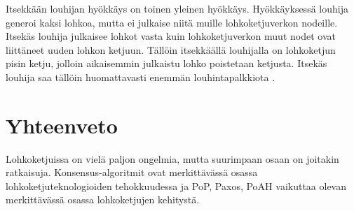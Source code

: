 \documentclass[utf8,bachelor]{gradu3}
\begin{document}
Itsekkään louhijan hyökkäys on toinen yleinen hyökkäys. Hyökkäyksessä louhija generoi kaksi lohkoa, mutta ei julkaise niitä muille lohkoketjuverkon nodeille. Itsekäs louhija julkaisee lohkot vasta kuin lohkoketjuverkon muut nodet ovat liittäneet uuden lohkon ketjuun. Tällöin itsekkäällä louhijalla on lohkoketjun pisin ketju, jolloin aikaisemmin julkaistu lohko poistetaan ketjusta. Itsekäs louhija saa tällöin huomattavasti enemmän louhintapalkkiota \parencite{zheng2017overview}. 




 \chapter{Yhteenveto}
 
 Lohkoketjuissa on vielä paljon ongelmia, mutta suurimpaan osaan on joitakin ratkaisuja.
 Konsensus-algoritmit ovat merkittävässä osassa lohkoketjuteknologioiden tehokkuudessa ja PoP, Paxos, PoAH vaikuttaa olevan merkittävässä osassa lohkoketjujen kehitystä.
 
 
 


\printbibliography

\appendix
\end{document}
